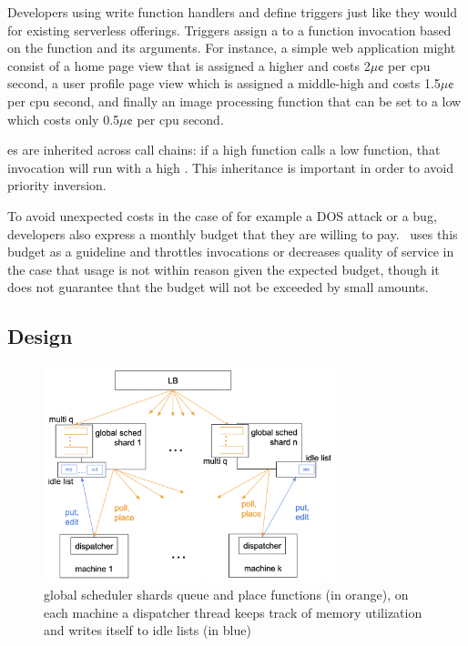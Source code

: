 Developers using \sys{} write function handlers and define triggers just like
they would for existing serverless offerings.  Triggers assign a \priceclass{}
to a function invocation based on the function and its arguments.
For instance, a simple web application might consist of a home page view that is
assigned a higher \priceclass{} and costs 2$\mu\cent$ per cpu second, a user
profile page view which is assigned a middle-high \class{} and costs
1.5$\mu\cent$ per cpu second, and finally an image processing function that can
be set to a low \class{} which costs only 0.5$\mu\cent$ per cpu second.

\Class{}es are inherited across call chains: if a high \class{} function calls a
low \class{} function, that invocation will run with a high \class{}. This
inheritance is important in order to avoid priority inversion.

To avoid unexpected costs in the case of for example a DOS attack or a bug,
developers also express a monthly budget that they are willing to pay.~\Sys{}
uses this budget as a guideline and throttles invocations or decreases quality
of service in the case that usage is not within reason given the expected
budget, though it does not guarantee that the budget will not be exceeded by
small amounts.

\subsection{\Sys{} Design}

\begin{figure}[t]
    \centering
      \includegraphics[width=8.5cm]{img/overview.png}
      \caption{ global scheduler shards queue and place functions (in orange),
      on each machine a dispatcher thread keeps track of memory utilization and
      writes itself to idle lists (in blue) }
    \label{fig:overview}
\end{figure}



